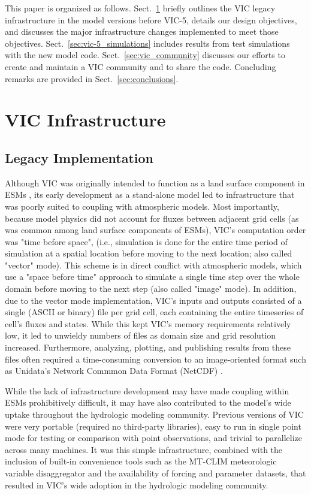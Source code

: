 \documentclass[gmd, manuscript]{copernicus}
\begin{document}
  This paper is organized as follows. Sect.~\ref{sec:vic_infrastructure} briefly outlines the VIC legacy infrastructure in the model versions before VIC-5, details our design objectives, and discusses the major infrastructure changes implemented to meet those objectives. Sect.~\ref{sec:vic-5_simulations} includes results from test simulations with the new model code. Sect.~\ref{sec:vic_community} discusses our efforts to create and maintain a VIC community and to share the code. Concluding remarks are provided in Sect.~\ref{sec:conclusions}.

\section{VIC Infrastructure}
  \label{sec:vic_infrastructure}
  \subsection{Legacy Implementation}
    \label{sec:vic_legacy}

  Although VIC was originally intended to function as a land surface component in ESMs \citep{Liang_1994}, its early development as a stand-alone model led to infrastructure that was poorly suited to coupling with atmospheric models.  Most importantly, because model physics did not account for fluxes between adjacent grid cells (as was common among land surface components of ESMs), VIC's computation order was "time before space", (i.e., simulation is done for the entire time period of simulation at a spatial location before moving to the next location; also called "vector" mode).  This scheme is in direct conflict with atmospheric models, which use a "space before time" approach to simulate a single time step over the whole domain before moving to the next step (also called "image" mode). In addition, due to the vector mode implementation, VIC's inputs and outputs consisted of a single (ASCII or binary) file per grid cell, each containing the entire timeseries of cell's fluxes and states. While this kept VIC's memory requirements relatively low, it led to unwieldy numbers of files as domain size and grid resolution increased. Furthermore, analyzing, plotting, and publishing results from these files often required a time-consuming conversion to an image-oriented format such as Unidata's Network Commmon Data Format (NetCDF) \citep{Rew_1990}.

  While the lack of infrastructure development may have made coupling within ESMs prohibitively difficult, it may have also contributed to the model's wide uptake throughout the hydrologic modeling community. Previous versions of VIC were very portable (required no third-party libraries), easy to run in single point mode for testing or comparison with point observations, and trivial to parallelize across many machines. It was this simple infrastructure, combined with the inclusion of built-in convenience tools such as the MT-CLIM \citep{Thornton_1999,Bohn_2013} meteorologic variable disaggregator and the availability of forcing and parameter datasets, that resulted in VIC's wide adoption in the hydrologic modeling community.
\end{document}
